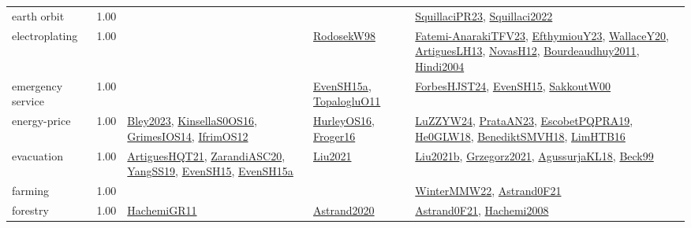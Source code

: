 {\begin{longtable}{p{3cm}r>{\raggedright\arraybackslash}p{6cm}>{\raggedright\arraybackslash}p{6cm}>{\raggedright\arraybackslash}p{8cm}}
\index{earth orbit}\index{ApplicationAreas!earth orbit}earth orbit &  1.00 &  &  & \hyperref[detail:SquillaciPR23]{SquillaciPR23}, \hyperref[detail:Squillaci2022]{Squillaci2022}\\
\index{electroplating}\index{ApplicationAreas!electroplating}electroplating &  1.00 &  & \hyperref[detail:RodosekW98]{RodosekW98} & \hyperref[detail:Fatemi-AnarakiTFV23]{Fatemi-AnarakiTFV23}, \hyperref[detail:EfthymiouY23]{EfthymiouY23}, \hyperref[detail:WallaceY20]{WallaceY20}, \hyperref[detail:ArtiguesLH13]{ArtiguesLH13}, \hyperref[detail:NovasH12]{NovasH12}, \hyperref[detail:Bourdeaudhuy2011]{Bourdeaudhuy2011}, \hyperref[detail:Hindi2004]{Hindi2004}\\
\index{emergency service}\index{ApplicationAreas!emergency service}emergency service &  1.00 &  & \hyperref[detail:EvenSH15a]{EvenSH15a}, \hyperref[detail:TopalogluO11]{TopalogluO11} & \hyperref[detail:ForbesHJST24]{ForbesHJST24}, \hyperref[detail:EvenSH15]{EvenSH15}, \hyperref[detail:SakkoutW00]{SakkoutW00}\\
\index{energy-price}\index{ApplicationAreas!energy-price}energy-price &  1.00 & \hyperref[detail:Bley2023]{Bley2023}, \hyperref[detail:KinsellaS0OS16]{KinsellaS0OS16}, \hyperref[detail:GrimesIOS14]{GrimesIOS14}, \hyperref[detail:IfrimOS12]{IfrimOS12} & \hyperref[detail:HurleyOS16]{HurleyOS16}, \hyperref[detail:Froger16]{Froger16} & \hyperref[detail:LuZZYW24]{LuZZYW24}, \hyperref[detail:PrataAN23]{PrataAN23}, \hyperref[detail:EscobetPQPRA19]{EscobetPQPRA19}, \hyperref[detail:He0GLW18]{He0GLW18}, \hyperref[detail:BenediktSMVH18]{BenediktSMVH18}, \hyperref[detail:LimHTB16]{LimHTB16}\\
\index{evacuation}\index{ApplicationAreas!evacuation}evacuation &  1.00 & \hyperref[detail:ArtiguesHQT21]{ArtiguesHQT21}, \hyperref[detail:ZarandiASC20]{ZarandiASC20}, \hyperref[detail:YangSS19]{YangSS19}, \hyperref[detail:EvenSH15]{EvenSH15}, \hyperref[detail:EvenSH15a]{EvenSH15a} & \hyperref[detail:Liu2021]{Liu2021} & \hyperref[detail:Liu2021b]{Liu2021b}, \hyperref[detail:Grzegorz2021]{Grzegorz2021}, \hyperref[detail:AgussurjaKL18]{AgussurjaKL18}, \hyperref[detail:Beck99]{Beck99}\\
\index{farming}\index{ApplicationAreas!farming}farming &  1.00 &  &  & \hyperref[detail:WinterMMW22]{WinterMMW22}, \hyperref[detail:Astrand0F21]{Astrand0F21}\\
\index{forestry}\index{ApplicationAreas!forestry}forestry &  1.00 & \hyperref[detail:HachemiGR11]{HachemiGR11} & \hyperref[detail:Astrand2020]{Astrand2020} & \hyperref[detail:Astrand0F21]{Astrand0F21}, \hyperref[detail:Hachemi2008]{Hachemi2008}\\

\end{longtable}}
